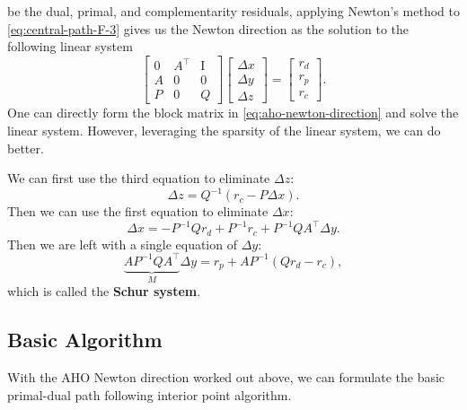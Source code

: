 \documentclass[
]{book}
\theoremstyle{definition}
\theoremstyle{definition}
\theoremstyle{definition}
\theoremstyle{definition}
\theoremstyle{remark}
\begin{document}
be the dual, primal, and complementarity residuals, applying Newton's method to \eqref{eq:central-path-F-3} gives us the Newton direction as the solution to the following linear system
\begin{equation}
\begin{bmatrix}
0 & A^\top& \mathrm{I}\\
A & 0 & 0 \\
P & 0 & Q 
\end{bmatrix} 
\begin{bmatrix} \Delta x \\ \Delta y \\ \Delta z \end{bmatrix} = \begin{bmatrix} r_d \\ r_p \\ r_c \end{bmatrix}.
\label{eq:aho-newton-direction}
\end{equation}
One can directly form the block matrix in \eqref{eq:aho-newton-direction} and solve the linear system. However, leveraging the sparsity of the linear system, we can do better.

We can first use the third equation to eliminate \(\Delta z\):
\begin{equation}
\Delta z = Q^{-1}(r_c - P \Delta x).
\label{eq:aho-eliminate-z}
\end{equation}
Then we can use the first equation to eliminate \(\Delta x\):
\begin{equation}
\Delta x = - P^{-1}Q r_d + P^{-1}r_c + P^{-1}Q A^\top\Delta y.
\label{eq:aho-eliminate-x}
\end{equation}
Then we are left with a single equation of \(\Delta y\):
\begin{equation}
\underbrace{ A P^{-1}Q A^\top}_{M} \Delta y = r_p + A P^{-1}(Q r_d - r_c),
\label{eq:aho-schur-system}
\end{equation}
which is called the \textbf{Schur system}.

\subsection{Basic Algorithm}\label{basic-algorithm}

With the AHO Newton direction worked out above, we can formulate the basic primal-dual path following interior point algorithm.
\end{document}
